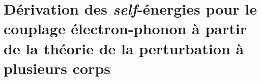 \chapter{Dérivation des \textit{self}-énergies pour le couplage électron-phonon à partir de la théorie de la perturbation à plusieurs corps}\label{annexe:eph}